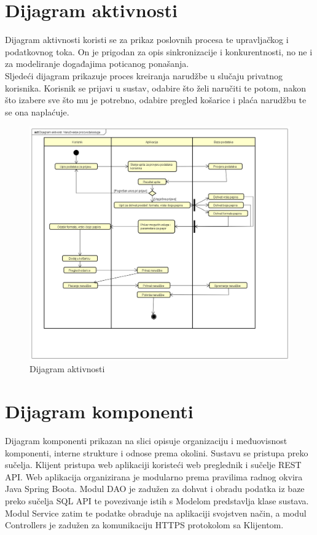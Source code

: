 			
			\eject 
		
		\section{Dijagram aktivnosti}
			
			
			 
			 Dijagram aktivnosti koristi se za prikaz poslovnih procesa te upravljačkog i podatkovnog toka. On je prigodan za opis sinkronizacije i konkurentnosti, no ne i za modeliranje događajima poticanog ponašanja.
			 \\
			 Sljedeći dijagram prikazuje proces kreiranja narudžbe u slučaju privatnog korisnika. Korisnik se prijavi u sustav, odabire što želi naručiti te potom, nakon što izabere sve što mu je potrebno, odabire pregled košarice i plaća narudžbu te se ona naplaćuje.
			 \\
			 \begin{figure}[H]
			 	\includegraphics[scale=0.5]{dijagrami/dijagram_aktivnosti.PNG} 
			 	\centering
			 	\caption{Dijagram aktivnosti}
			 	\label{fig:dij_akt}%
			 \end{figure}
			
			
			
			\eject
		\section{Dijagram komponenti}
			Dijagram komponenti prikazan na slici  opisuje organizaciju i međuovisnost
			komponenti, interne strukture i odnose prema okolini. Sustavu se pristupa preko sučelja. Klijent pristupa web aplikaciji koristeći web preglednik i sučelje REST API. Web aplikacija organizirana je modularno prema pravilima radnog okvira Java Spring Boota. Modul DAO je zadužen za dohvat i obradu podatka iz baze preko sučelja SQL API te povezivanje istih s Modelom predstavlja klase sustava.  Modul Service zatim te podatke obraduje na aplikaciji svojstven način, a modul Controllers je zadužen za komunikaciju HTTPS protokolom sa Klijentom.
			
